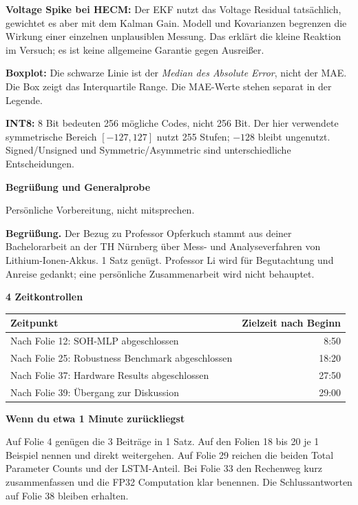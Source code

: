 \textbf{Voltage Spike bei HECM:} Der EKF nutzt das Voltage Residual tatsächlich,
gewichtet es aber mit dem Kalman Gain. Modell und Kovarianzen begrenzen die
Wirkung einer einzelnen unplausiblen Messung. Das erklärt die kleine Reaktion
im Versuch; es ist keine allgemeine Garantie gegen Ausreißer.

\textbf{Boxplot:} Die schwarze Linie ist der \emph{Median des Absolute Error},
nicht der MAE. Die Box zeigt das Interquartile Range. Die MAE-Werte stehen
separat in der Legende.

\textbf{INT8:} 8 Bit bedeuten 256 mögliche Codes, nicht 256 Bit. Der hier verwendete
symmetrische Bereich $[-127,127]$ nutzt 255 Stufen; $-128$ bleibt ungenutzt.
Signed/Unsigned und Symmetric/Asymmetric sind unterschiedliche Entscheidungen.

\clearpage
{}
{\Large\bfseries Begrüßung und Generalprobe\par}
{\small\color{quiet}Persönliche Vorbereitung, nicht mitsprechen.\par}

\textbf{Begrüßung.}
Der Bezug zu Professor Opferkuch stammt aus deiner Bachelorarbeit an der
TH Nürnberg über Mess- und Analyseverfahren von Lithium-Ionen-Akkus.
1 Satz genügt. Professor Li wird für Begutachtung und Anreise gedankt;
eine persönliche Zusammenarbeit wird nicht behauptet.

\textbf{4 Zeitkontrollen}\par
\begin{tabularx}{\linewidth}{@{}>{\raggedright\arraybackslash}Xr@{}}
\toprule
Zeitpunkt & Zielzeit nach Beginn \\
\midrule
Nach Folie 12: SOH-MLP abgeschlossen & 8:50 \\
Nach Folie 25: Robustness Benchmark abgeschlossen & 18:20 \\
Nach Folie 37: Hardware Results abgeschlossen & 27:50 \\
Nach Folie 39: Übergang zur Diskussion & 29:00 \\
\bottomrule
\end{tabularx}

\vspace{4mm}
\textbf{Wenn du etwa 1 Minute zurückliegst}\par
Auf Folie 4 genügen die 3 Beiträge in 1 Satz.
Auf den Folien 18 bis 20 je 1 Beispiel nennen und direkt weitergehen.
Auf Folie 29 reichen die beiden Total Parameter Counts und der LSTM-Anteil.
Bei Folie 33 den Rechenweg kurz zusammenfassen und die FP32 Computation
klar benennen. Die Schlussantworten auf Folie 38 bleiben erhalten.

